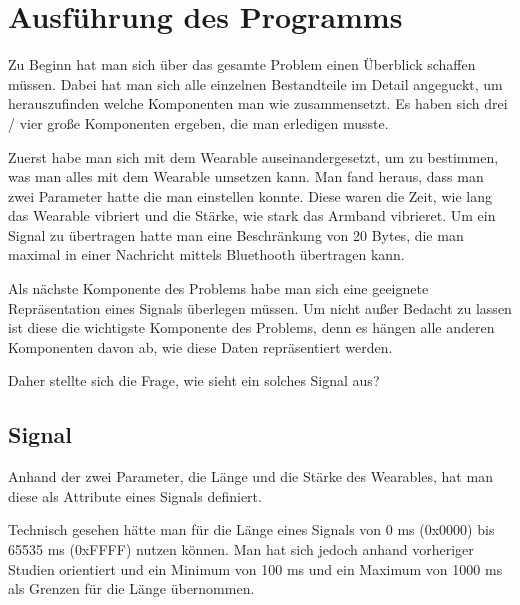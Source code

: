 
\section{Ausf{\"u}hrung des Programms}
\label{ch:Entwurf:sec:Ausf{\"u}hrung des Programms}

Zu Beginn hat man sich {\"u}ber das gesamte Problem einen {\"U}berblick schaffen m{\"u}ssen.
Dabei hat man sich alle einzelnen Bestandteile im Detail angeguckt, um herauszufinden welche Komponenten man wie zusammensetzt. 
Es haben sich drei / vier gro{\ss}e Komponenten ergeben, die man erledigen musste.

Zuerst habe man sich mit dem Wearable auseinandergesetzt, um zu bestimmen, was man alles mit dem Wearable umsetzen kann.
Man fand heraus, dass man zwei Parameter hatte die man einstellen konnte. Diese waren die Zeit, wie lang das Wearable vibriert und die St{\"a}rke, wie stark das Armband vibrieret.
Um ein Signal zu {\"u}bertragen hatte man eine Beschr{\"a}nkung von 20 Bytes, die man maximal in einer Nachricht mittels Bluethooth {\"u}bertragen kann.

Als n{\"a}chste Komponente des Problems habe man sich eine geeignete Repr{\"a}sentation eines Signals {\"u}berlegen m{\"u}ssen. Um nicht au{\ss}er Bedacht zu lassen ist diese die wichtigste Komponente des Problems, denn es h{\"a}ngen alle anderen Komponenten davon ab, wie diese Daten repr{\"a}sentiert werden. 

Daher stellte sich die Frage, wie sieht ein solches Signal aus?

\subsection{Signal}

Anhand der zwei Parameter, die L{\"a}nge und die St{\"a}rke des Wearables, hat man diese als Attribute eines Signals definiert.  

Technisch gesehen h{\"a}tte man f{\"u}r die L{\"a}nge eines Signals von 0 ms (0x0000) bis 65535 ms (0xFFFF) nutzen k{\"o}nnen. 
Man hat sich jedoch anhand vorheriger Studien \cite{pescara2016ruttelflug} orientiert und ein Minimum von 100 ms und ein Maximum von 1000 ms als Grenzen f{\"u}r die L{\"a}nge {\"u}bernommen.

